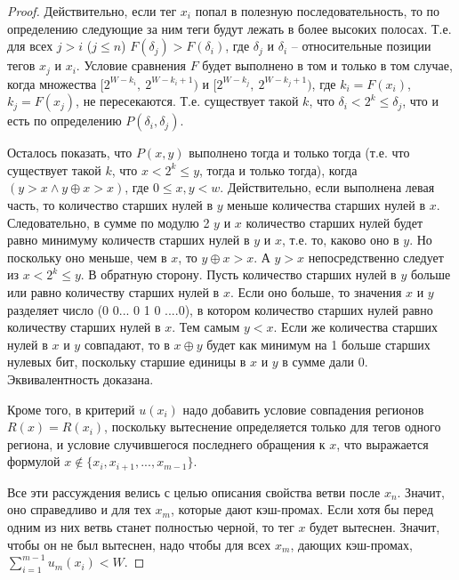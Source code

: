 \begin{proof}
  Действительно, если тег $x_i$ попал в полезную последовательность,
  то по определению следующие за ним теги будут лежать в более
  высоких полосах. Т.е. для всех $j > i$ ($j \leqslant n$)
  $F(\delta_j) > F(\delta_i)$, где $\delta_j$ и $\delta_i$ --
  относительные позиции тегов $x_j$ и $x_i$. Условие сравнения $F$
  будет выполнено в том и только в том случае, когда множества
  $[2^{W-k_i},~2^{W-k_i+1})$ и
  $[2^{W-k_j},~2^{W-k_j+1})$, где $k_i = F(x_i)$,
  $k_j = F(x_j)$, не пересекаются. Т.е. существует такой $k$, что
  $\delta_i < 2^k \leqslant \delta_j$, что и есть по определению $P(\delta_i,
  \delta_j)$.

  Осталось показать, что $P(x,y)$ выполнено тогда и только тогда
  (т.е. что существует такой $k$, что $x < 2^k \leqslant y$, тогда и
  только тогда), когда $(y > x \wedge y
  \oplus x > x)$, где $0\leqslant x, y < w$. Действительно, если
  выполнена левая часть, то количество старших нулей в $y$ меньше
  количества старших нулей в $x$. Следовательно, в сумме по модулю 2
  $y$ и $x$ количество старших нулей будет равно минимуму количеств
  старших нулей в $y$ и $x$, т.е. то, каково оно в $y$. Но поскольку
  оно меньше, чем в $x$, то $y \oplus x > x$. А $y > x$
  непосредственно следует из $x < 2^k \leqslant y$. В обратную
  сторону. Пусть количество старших нулей в $y$ больше или равно
  количеству старших нулей в $x$. Если оно больше, то значения $x$ и
  $y$ разделяет число (0 0... 0 1 0 ....0), в котором количество
  старших нулей равно количеству старших нулей в $x$. Тем самым $y <
  x$. Если же количества старших нулей в $x$ и $y$ совпадают, то в
  $x \oplus y$ будет как минимум на 1 больше старших нулевых бит,
  поскольку старшие единицы в $x$ и $y$ в сумме дали 0.
  Эквивалентность доказана.

  Кроме того, в критерий $u(x_i)$ надо добавить условие совпадения
  регионов $R(x) = R(x_i)$, поскольку вытеснение определяется только
  для тегов одного региона, и условие случившегося последнего
  обращения к $x$, что выражается формулой $x \notin \{x_i, x_{i+1},
  ..., x_{m-1}\}$.

  Все эти рассуждения велись с целью описания свойства ветви после
  $x_n$. Значит, оно справедливо и для тех $x_m$, которые дают
  кэш-промах. Если хотя бы перед одним из них ветвь станет полностью
  черной, то тег $x$ будет вытеснен. Значит, чтобы он не был
  вытеснен, надо чтобы для всех $x_m$, дающих кэш-промах,
  $\sum_{i=1}^{m-1} u_m(x_i) < W$.
\end{proof}

